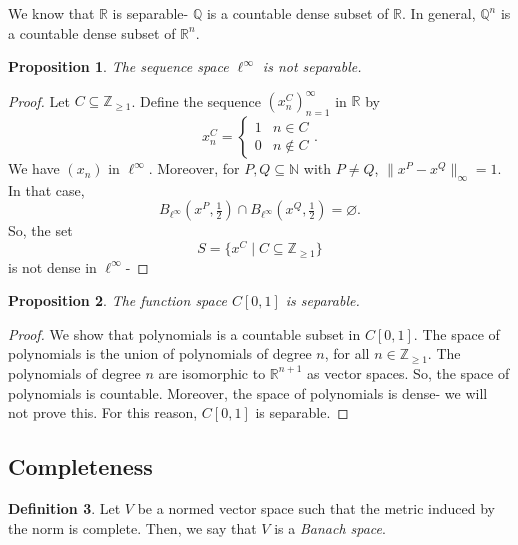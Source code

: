\documentclass[a4paper, openany]{memoir}
\theoremstyle{definition}
\newtheorem{definition}{Definition}[section]
\theoremstyle{plain}
\newtheorem{proposition}[definition]{Proposition}
\begin{document}
We know that $\mathbb{R}$ is separable- $\mathbb{Q}$ is a countable dense subset of $\mathbb{R}$. In general, $\mathbb{Q}^n$ is a countable dense subset of $\mathbb{R}^n$.

\begin{proposition}
    The sequence space $\ell^\infty$ is not separable.
\end{proposition}
\begin{proof}
    Let $C \subseteq \mathbb{Z}_{\geq 1}$. Define the sequence $(x^C_n)_{n=1}^\infty$ in $\mathbb{R}$ by 
    \[x^C_n = \begin{cases}
        1 & n \in C \\
        0 & n \not\in C
    \end{cases}.\]
    We have $(x_n)$ in $\ell^\infty$. Moreover, for $P, Q \subseteq \mathbb{N}$ with $P \neq Q$, $\lVert x^P - x^Q \rVert_\infty = 1$. In that case,
    \[B_{\ell^\infty}(x^P, \tfrac{1}{2}) \cap B_{\ell^\infty}(x^Q, \tfrac{1}{2}) = \varnothing.\]
    So, the set
    \[S = \{x^C \mid C \subseteq \mathbb{Z}_{\geq 1}\}\]
    is not dense in $\ell^\infty$- 
\end{proof}


\begin{proposition}
    The function space $C[0, 1]$ is separable.
\end{proposition}
\begin{proof}
    We show that polynomials is a countable subset in $C[0, 1]$. The space of polynomials is the union of polynomials of degree $n$, for all $n \in \mathbb{Z}_{\geq 1}$. The polynomials of degree $n$ are isomorphic to $\mathbb{R}^{n+1}$ as vector spaces. So, the space of polynomials is countable. Moreover, the space of polynomials is dense- we will not prove this. For this reason, $C[0, 1]$ is separable.
\end{proof}

\subsection{Completeness}
\begin{definition}
    Let $V$ be a normed vector space such that the metric induced by the norm is complete. Then, we say that $V$ is a \emph{Banach space}.
\end{definition}
\end{document}
